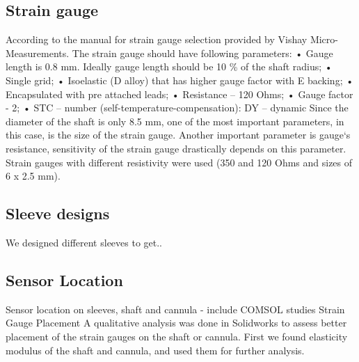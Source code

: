 \subsection{Strain gauge}
\label{sec:SGReq}
According to the manual for strain gauge selection provided by Vishay Micro-Measurements. The strain gauge should have following parameters:
• Gauge length is 0.8 mm. Ideally gauge length should be 10 \% of the shaft radius;
• Single grid;
• Isoelastic (D alloy) that has higher gauge factor with E backing;
• Encapsulated with pre attached leads;
• Resistance – 120 Ohms;
• Gauge factor - 2;
• STC – number (self-temperature-compensation): DY – dynamic
Since the diameter of the shaft is only 8.5 mm, one of the most important parameters, in this
case, is the size of the strain gauge. Another important parameter is gauge‘s resistance, sensitivity
of the strain gauge drastically depends on this parameter. Strain gauges with different resistivity
were used (350 and 120 Ohms and sizes of 6 x 2.5 mm).

\subsection{Sleeve designs}
\label{sec:SlevDes}
We designed different sleeves to get..

\subsection{Sensor Location}
\label{sec:SenLoc}
Sensor location on sleeves, shaft and cannula - include COMSOL studies
Strain Gauge Placement
A qualitative analysis was done in Solidworks to assess better placement of the strain gauges on the shaft or cannula. First we found elasticity modulus of the shaft and cannula, and used them for further analysis.


